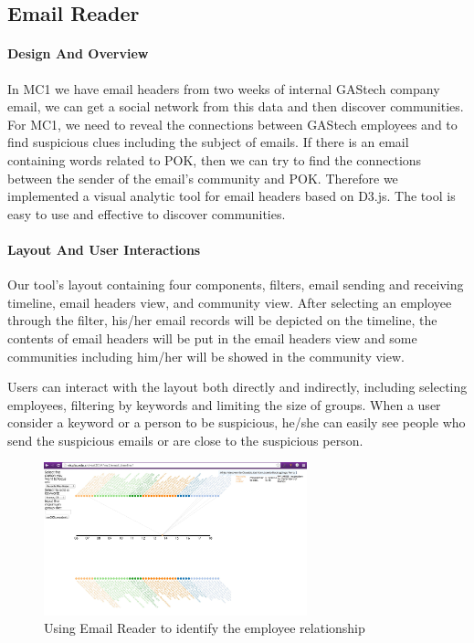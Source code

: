\documentclass{vgtc}                          %
\begin{document}
\subsection{Email Reader}
\paragraph{Design And Overview}
In MC1 we have email headers from two weeks of internal GAStech company email, we can get a social network from this data and then discover communities. For MC1, we need to reveal the connections between GAStech employees and to find suspicious clues including the subject of emails. If there is an email containing words related to POK, then we can try to find the connections between the sender of the email's community and POK. Therefore we implemented a visual analytic tool for email headers based on D3.js. The tool is easy to use and effective to discover communities. 

\paragraph{Layout And User Interactions}
Our tool's layout containing four components, filters, email sending and receiving timeline, email headers view, and community view.
After selecting an employee through the filter, his/her email records will be depicted on the timeline, the contents of email headers will be put in the email headers view and some communities including him/her will be showed in the community view.  
\par
Users can interact with the layout both directly and indirectly, including selecting employees, filtering by keywords and limiting the size of groups. When a user consider a keyword or a person to be suspicious, he/she can easily see people who send the suspicious emails or are close to the suspicious person.
\begin{figure}[htb]
  \centering
  \includegraphics[width=3in]{image_et.png}
  \caption{Using Email Reader to identify the employee relationship}
\end{figure}
\end{document}
